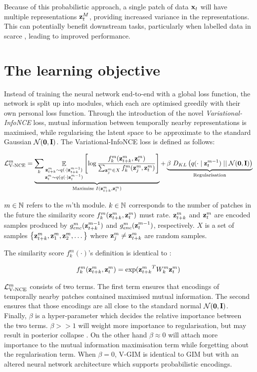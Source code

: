 			
		Because of this probabilistic approach, a single patch of data $\mathbf{x}_t$ will have multiple representations $\mathbf{z}_t^M$, providing increased variance in the representations. This can potentially benefit downstream tasks, particularly when labelled data in scarce \cite{weiRecentAdvancesVariational2021}, leading to improved performance. %
			

		
		
\section{The learning objective}
	Instead of training the neural network end-to-end with a global loss function, the network is split up into modules, which each are optimised greedily with their own personal loss function. Through the introduction of the novel \textit{Variational-InfoNCE} loss, mutual information between temporally nearby representations is maximised, while regularising the latent space to be approximate to the standard Gaussian $\mathcal{N}(\bm{\mathbf{0}}, \mathbf{I})$. The Variational-InfoNCE loss is defined as follows:
	
	\begin{equation} %
		\Lvnce^m =
		\underbrace{\reconstrgim}_{\text{Maximise } I(\ztk^m, \zt^m)} + \underbrace{\beta ~ \latentspaceconstraintgim}_{\text{Regularisation}}
		\label{eq:variational_gim_loss}
	\end{equation}

	$m \in \mathbb{N}$ refers to the $m$'th module. $k \in \mathbb{N}$ corresponds to the number of patches in the future the similarity score $f_k^m(\mathbf{z}_{t+k}^m,\mathbf{z}_t^m)$ must rate. $\mathbf{z}_{t+k}^m$ and $\mathbf{z}_t^m$ are encoded samples produced by $g_{enc}^m(\mathbf{z}_{t+k}^{m-1})$ and $g_{enc}^m(\mathbf{z}_t^{m-1})$, respectively. $X$ is a set of samples ${ \left\{ \mathbf{z}_{t+k}^m, \mathbf{z}_1^m, \mathbf{z}_2^m, \dots \right\} }$ where $\mathbf{z}_j^m \neq \mathbf{z}_{t+k}^m$ are random samples.


	The similarity score $f_k^m(\cdot)$'s definition is identical to \cite{lowePuttingEndEndtoEnd2020}:
	
	$$ f_k^m(\mathbf{z}_{t+k}^m,\mathbf{z}_t^m) = \exp({\mathbf{z}_{t+k}^m}^TW_k^m\mathbf{z}_t^m) $$
	
	$\mathcal{L}_{\text{V-NCE}}^m$ consists of two terms. The first term ensures that encodings of temporally nearby patches contained maximised mutual information. The second ensures that those encodings are all close to the standard normal $\mathcal{N}(\bm{\mathbf{0}}, \mathbf{I})$. Finally, $\beta$ is a hyper-parameter which decides the relative importance between the two terms. $\beta >> 1$ will weight more importance to regularisation, but may result in posterior collapse \cite{lucasUnderstandingPosteriorCollapse2022}. On the other hand $\beta \approx 0$ will attach more importance to the mutual information maximisation term while forgetting about the regularisation term. When $\beta = 0$, V-GIM is identical to GIM but with an altered neural network architecture which supports probabilistic encodings.
	
